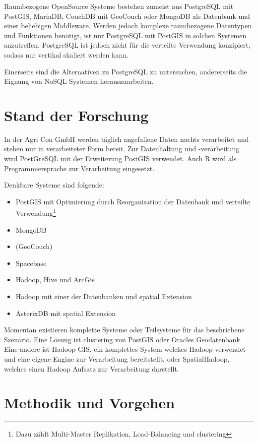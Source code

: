 \documentclass[
a4paper,     %
12pt         %
]{scrartcl}  %
\begin{document}
Raumbezogene OpenSource Systeme bestehen zumeist aus PostgreSQL mit PostGIS, MariaDB, CouchDB mit GeoCouch oder MongoDB als Datenbank und einer beliebigen Middleware.
Werden jedoch komplexe raumbezogene Datentypen und Funktionen benötigt, ist nur PostgreSQL mit PostGIS in solchen Systemen anzutreffen.
PostgreSQL ist jedoch nicht für die verteilte Verwendung konzipiert, sodass nur vertikal skaliert werden kann.


Einerseits sind die Alternativen zu PostgreSQL zu untersuchen, andererseits die Eignung von NoSQL Systemen herauszuarbeiten.


\section{Stand der Forschung}

In der Agri Con GmbH werden täglich angefallene Daten nachts verarbeitet und stehen nur in verarbeiteter Form bereit.
Zur Datenhaltung und -verarbeitung wird PostGreSQL mit der Erweiterung PostGIS verwendet. Auch R wird als Programmiersprache zur Verarbeitung eingesetzt.

Denkbare Systeme sind folgende:
\begin{itemize}
\item PostGIS mit Optimierung durch Reorganisation der Datenbank und verteilte Verwendung\footnote{Dazu zählt Multi-Master Replikation, Load-Balancing und clustering}
\item MongoDB
\item (GeoCouch)
\item Spacebase
\item Hadoop, Hive und ArcGis
\item Hadoop mit einer der Datenbanken und spatial Extension
\item AsterixDB mit spatial Extension
\end{itemize}


Momentan existieren komplette Systeme oder Teilsysteme für das beschriebene Szenario.
Eine Lösung ist clustering von PostGIS oder Oracles Geodatenbank.
Eine andere ist Hadoop-GIS, ein komplettes System welches Hadoop verwendet und eine eigene Engine zur Verarbeitung bereitstellt, oder SpatialHadoop, welches einen Hadoop Aufsatz zur Verarbeitung darstellt.

\section{Methodik und Vorgehen}
\end{document}
